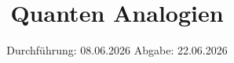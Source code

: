 

\subject{v23}
\title{Quanten Analogien}
\date{%
  Durchführung: 08.06.2026
  \hspace{3em}
  Abgabe: 22.06.2026
}



\maketitle
\thispagestyle{empty}
\tableofcontents
\newpage






\printbibliography{}


